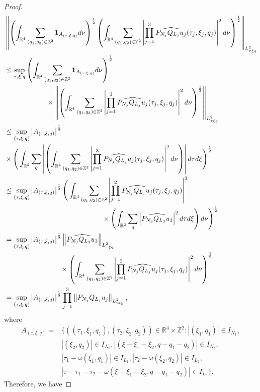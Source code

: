 \documentclass[12pt,oneside,reqno]{amsart}
\numberwithin{equation}{section}
\theoremstyle{plain}
\def\R{{\mathbb R}}
\def\Z{{\mathbb Z}}
\newcommand{\abs}[1]{%
    \left|#1\right|%
}
\newcommand{\prc}[1]{%
    \left(#1\right)
}
\newcommand{\ds}{\displaystyle}
\newcommand{\Lptxy}[3]{%
    \left\lVert #1\right\rVert_{L^{#2}_{#3}}%
}
\newcommand{\PQ}[2]{%
    P_{N_{#2}}Q_{L_{#2}}#1_{#2}%
}
\newcommand{\FPQ}[2]{%
    \widehat{P_{N_{#2}}Q_{L_{#2}}#1_{#2}}%
}
\newcommand{\FPQwV}[2]{%
    \widehat{%
        P_{N_{#2}}Q_{L_{#2}}#1_{#2}%
    }%
    (\tau_{#2},\xi_{#2},q_{#2})%
}
\newcommand{\prdd}{%
    \prod_{j=1}^{3}%
}
\begin{document}
\begin{proof}
\begin{align*}  
 &\Lptxy{\prc{\int_{\R^4}  \ds\sum_{(q_1,q_2) \in \Z^2} \mathbf 1_{A_{(\tau, \xi, q)} } d\nu}^\frac{1}{2} \prc{\int_{\R^4} \ds\sum_{(q_1,q_2) \in \Z^2} \abs{\prdd \FPQwV{u}{j}}^2 d\nu}^\frac{1}{2} }{2}{\tau \xi q}\\
& \leq \sup_{\tau,\xi,q}\prc{ \int_{\R^4} \sum_{(q_1,q_2) \in \Z^2} {\mathbf 1_{A_{(\tau, \xi, q)} }}  d\nu}^\frac{1}{2} \\
&\qquad \qquad \qquad  \times  \Lptxy{ \prc{\int_{\R^4} \ds\sum_{(q_1,q_2) \in \Z^2} \abs{\prdd \FPQwV{u}{j}}^2 d \nu}^\frac{1}{2} }{2}{\tau \xi q}\\
& \leq  \sup_{(\tau,\xi,q)}\abs{A_{(\tau,\xi,q)}}^\frac{1}{2}\\
&\times \Bigg(\int_{\R^2}\sum_{q} \abs{\prc{\int_{\R^4} \sum_{(q_1,q_2) \in \Z^2} \abs{\prdd \FPQwV{u}{j}}^2 d \nu}}d\tau d\xi\Bigg)^\frac{1}{2} \\
& \leq \sup_{(\tau,\xi,q)}\abs{A_{(\tau,\xi,q)}}^\frac{1}{2} \Bigg(\int_{\R^4}\sum_{(q_1,q_2) \in \Z^2}   \abs{\prod_{j=1}^2\FPQwV{u}{j}}^2\\
&\qquad \qquad \qquad \qquad \qquad \qquad \qquad  \times \prc{\int_{\R^2} \sum_q \abs{\FPQ{u}{3}}^2 d\tau d\xi} d\nu\Bigg)^\frac{1}{2}\\
&= \sup_{(\tau,\xi,q)}\abs{A_{(\tau,\xi,q)}}^\frac{1}{2}   \Lptxy{\FPQ{u}{3}}{2}{\tau \xi q}\\
&\qquad \qquad \qquad \qquad  \times \prc{\int_{\R^4}\sum_{(q_1,q_2) \in \Z^2}   \abs{\prod_{j=1}^2\FPQwV{u}{j}}^2d\nu}^\frac{1}{2}\\
&= \sup_{(\tau,\xi,q)}\abs{A_{(\tau,\xi,q)}}^\frac{1}{2} \prod_{j=1}^3 \Lptxy{\PQ{u}{j}}{2}{t x y},
\end{align*}
where 
\begin{equation}
\begin{aligned}
\label{TheSetA}
A_{(\tau,\xi,q)} = &\{ ((\tau_1,\xi_1,q_1),(\tau_2,\xi_2,q_2)) \in \R^4 \times \Z^2: \abs{(\xi_1,q_1)} \in I_{N_1},\\
 &\abs{(\xi_2,q_2)} \in I_{N_2},\abs{(\xi - \xi_1 - \xi_2,q - q_1 -q_2)} \in I_{N_3},\\
  &\abs{\tau_1 - \omega(\xi_1,q_1)} \in I_{L_1}, \abs{\tau_2 - \omega(\xi_2,q_2)} \in I_{L_2},\\ 
&\abs{\tau-\tau_1 - \tau_2 - \omega(\xi-\xi_1-\xi_2, q - q_1 -q_2)} \in I_{L_3}\}.
\end{aligned}
\end{equation}
Therefore, we have


\end{proof}
\end{document}
